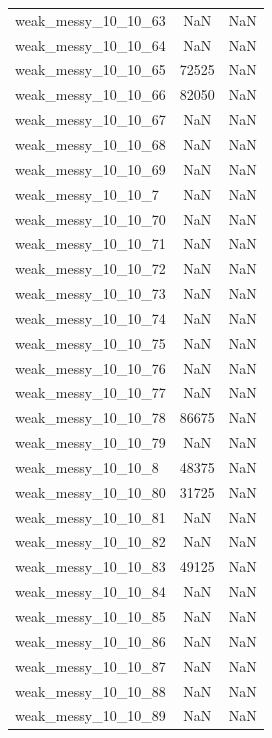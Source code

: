 \begin{longtable}{lcc}
weak\_messy\_10\_10\_63    &      NaN &    NaN \\
weak\_messy\_10\_10\_64    &      NaN &    NaN \\
weak\_messy\_10\_10\_65    &    72525 &    NaN \\
weak\_messy\_10\_10\_66    &    82050 &    NaN \\
weak\_messy\_10\_10\_67    &      NaN &    NaN \\
weak\_messy\_10\_10\_68    &      NaN &    NaN \\
weak\_messy\_10\_10\_69    &      NaN &    NaN \\
weak\_messy\_10\_10\_7     &      NaN &    NaN \\
weak\_messy\_10\_10\_70    &      NaN &    NaN \\
weak\_messy\_10\_10\_71    &      NaN &    NaN \\
weak\_messy\_10\_10\_72    &      NaN &    NaN \\
weak\_messy\_10\_10\_73    &      NaN &    NaN \\
weak\_messy\_10\_10\_74    &      NaN &    NaN \\
weak\_messy\_10\_10\_75    &      NaN &    NaN \\
weak\_messy\_10\_10\_76    &      NaN &    NaN \\
weak\_messy\_10\_10\_77    &      NaN &    NaN \\
weak\_messy\_10\_10\_78    &    86675 &    NaN \\
weak\_messy\_10\_10\_79    &      NaN &    NaN \\
weak\_messy\_10\_10\_8     &    48375 &    NaN \\
weak\_messy\_10\_10\_80    &    31725 &    NaN \\
weak\_messy\_10\_10\_81    &      NaN &    NaN \\
weak\_messy\_10\_10\_82    &      NaN &    NaN \\
weak\_messy\_10\_10\_83    &    49125 &    NaN \\
weak\_messy\_10\_10\_84    &      NaN &    NaN \\
weak\_messy\_10\_10\_85    &      NaN &    NaN \\
weak\_messy\_10\_10\_86    &      NaN &    NaN \\
weak\_messy\_10\_10\_87    &      NaN &    NaN \\
weak\_messy\_10\_10\_88    &      NaN &    NaN \\
weak\_messy\_10\_10\_89    &      NaN &    NaN \\

\end{longtable}
